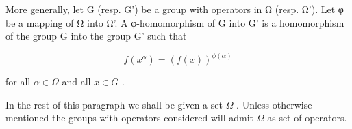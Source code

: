 More generally, let G (resp. G') be a group with operators in Ω (resp. Ω'). Let φ be a mapping of Ω into Ω'. A φ-homomorphism of G into G' is a homomorphism of the group G into the group G' such that

\[
f (x ^ {\alpha}) = (f (x)) ^ {\phi (\alpha)}
\]

for all \(\alpha \in \Omega\) and all \(x \in G\) .

In the rest of this paragraph we shall be given a set \(\Omega\) . Unless otherwise mentioned the groups with operators considered will admit \(\Omega\) as set of operators.

